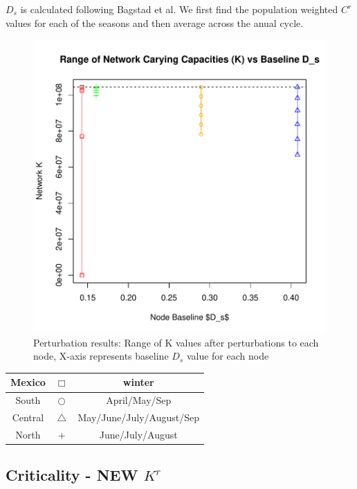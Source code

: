 \documentclass[10pt]{article}
\begin{document}
$D_s$ is calculated following Bagstad et al. We first find the population weighted $C^r$ values for each of the seasons and then average across the anual cycle.


\vspace{-.5cm}
\begin{figure}[H]
\begin{center}
\includegraphics[width=.8\textwidth, height=.8\textwidth]{RGraphics-monarch_barcr_DS}
\caption{Perturbation results: Range of K values after perturbations to each node, X-axis represents baseline $D_s$ value for each node}\label{fig:monarch_barcr_DS}
\end{center}
\end{figure}

\vspace{-.5cm}
\begin{tabular}{|c|c|c|}
\hline
{\color{red} Mexico} & $\Box$ & winter \\
\hline
{\color{orange} South} & $\bigcirc$ & April/May/Sep \\
\hline
{\color{blue} Central} & $\triangle$ &  May/June/July/August/Sep \\
\hline
{\color{green} North} & $+$ & June/July/August \\
\hline
\end{tabular}





\newpage
\subsection{Criticality - NEW \texorpdfstring{$K^r$}{KR}}
\end{document}
